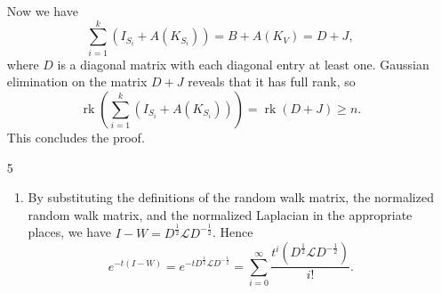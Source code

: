 \documentclass{article}
\newcommand{\1}{\mathbf{1}}
\newcommand{\0}{\mathbf{0}}
\renewcommand{\L}{\mathcal{L}}
\DeclareMathOperator{\rk}{rk}
\begin{document}
\begin{enumerate}
  Now we have
  \begin{equation*}
    \sum_{i = 1}^k (I_{S_i} + A(K_{S_i})) = B + A(K_V) = D + J,
  \end{equation*}
  where $D$ is a diagonal matrix with each diagonal entry at least one.
  Gaussian elimination on the matrix $D + J$ reveals that it has full rank, so
  \begin{equation*}
    \rk\left(\sum_{i = 1}^k (I_{S_i} + A(K_{S_i}))\right) = \rk(D + J) \geq n.
  \end{equation*}
  This concludes the proof.
\item[5]
  \begin{enumerate}
  \item
    By substituting the definitions of the random walk matrix, the normalized random walk matrix, and the normalized Laplacian in the appropriate places, we have $I - W = D^{\frac{1}{2}} \L D^{-\frac{1}{2}}$.
    Hence
    \begin{equation*}
      e^{-t(I - W)} = e^{-t D^{\frac{1}{2}} \L D^{-\frac{1}{2}}} = \sum_{i = 0}^\infty \frac{t^i (D^{\frac{1}{2}} \L D^{-\frac{1}{2}})}{i!}.
    \end{equation*}




\end{enumerate}
\end{enumerate}
\end{document}
